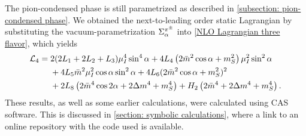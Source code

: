 The pion-condensed phase is still parametrized as described in \autoref{subsection: pion-condensed phase}.
We obtained the next-to-leading order static Lagrangian by substituting the vacuum-parametrization $\Sigma^{\pi^\pm}_\alpha$ into \autoref{NLO Lagrangian three flavor}, which yields
%
\begin{align}
    \label{bare static nlo lagrangian}
    \nonumber
    \mathcal{L}_4
    = {}&
    2(2L_1 + 2L_2 + L_3) \mu_I^4 \sin^4\alpha
    + 4  L_4 \left( 2 \bar m^2 \cos\alpha + m_S^2 \right) \mu_I^2\sin^2\alpha
    \\ \nonumber & 
    + 4 L_5 \bar m^2 \mu_I^2 \cos\alpha \sin^2 \alpha 
    + 4 L_6 (2\bar m^2\cos\alpha + m_S^2)^2
    \\ & 
    + 2 L_8 \left(2 \bar m^4 \cos2\alpha + 2 \Delta m^4 + m_S^4\right)
    + H_2 \left(2\bar m^4 + 2\Delta m^4 + m_S^4 \right).
\end{align}
%
These results, as well as some earlier calculations, were calculated using CAS software.
This is discussed in \autoref{section: symbolic calculations}, where a link to an online repository with the code used is available.

